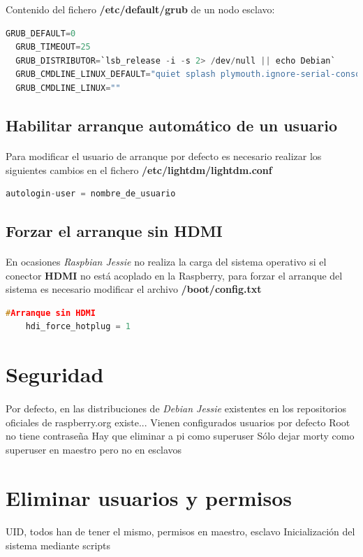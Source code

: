 Contenido del fichero \textbf{/etc/default/grub} de un nodo esclavo:

\begin{lstlisting}[language=c,frame=single,numbers=none]
  GRUB_DEFAULT=0
  GRUB_TIMEOUT=25
  GRUB_DISTRIBUTOR=`lsb_release -i -s 2> /dev/null || echo Debian`
  GRUB_CMDLINE_LINUX_DEFAULT="quiet splash plymouth.ignore-serial-consoles"
  GRUB_CMDLINE_LINUX=""
\end{lstlisting}

\subsection{Habilitar arranque automático de un usuario}
\paragraph{}

Para modificar el usuario de arranque por defecto es necesario realizar los siguientes cambios en el fichero \textbf{/etc/lightdm/lightdm.conf}
\begin{lstlisting}[language=c,frame=single,numbers=none]
  autologin-user = nombre_de_usuario
\end{lstlisting}

\subsection{Forzar el arranque sin HDMI}
\paragraph{}

En ocasiones \textit{Raspbian Jessie} no realiza la carga del sistema operativo si el conector \textbf{HDMI} no está acoplado en la Raspberry, para forzar el arranque del sistema es necesario modificar el archivo \textbf{/boot/config.txt}

\begin{lstlisting}[language=c,frame=single,numbers=none]
	#Arranque sin HDMI
    hdi_force_hotplug = 1
\end{lstlisting}

\section{Seguridad}
\label{makereference3.8}
\paragraph{}
Por defecto, en las distribuciones de \textit{Debian Jessie} existentes en los repositorios oficiales de raspberry.org existe...
Vienen configurados usuarios por defecto
Root no tiene contraseña
Hay que eliminar a pi como superuser
Sólo dejar morty como superuser en maestro pero no en esclavos

\section{Eliminar usuarios y permisos}
\label{makereference3.9}
\paragraph{}
UID, todos han de tener el mismo, permisos en maestro, esclavo
Inicialización del sistema mediante scripts


